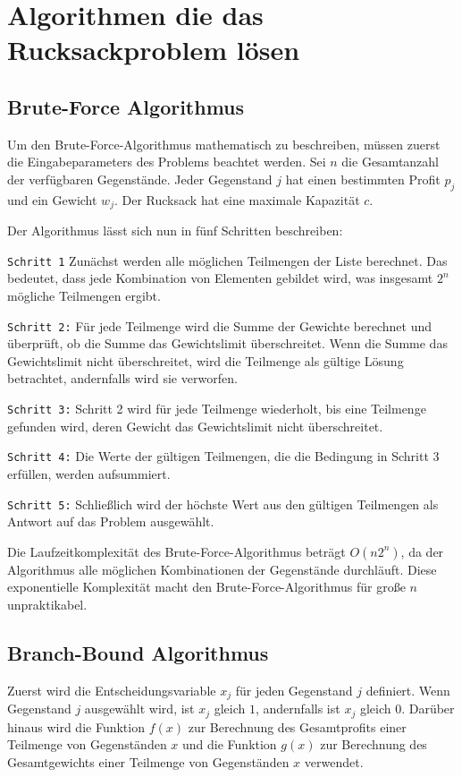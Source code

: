 
\chapter{Algorithmen die das Rucksackproblem lösen}
\section{Brute-Force Algorithmus}
Um den Brute-Force-Algorithmus mathematisch zu beschreiben, 
müssen zuerst die Eingabeparameters des Problems beachtet werden. Sei 
$n$ die Gesamtanzahl der verfügbaren Gegenstände. Jeder 
Gegenstand $j$ hat einen bestimmten Profit $p_j$ und ein Gewicht $w_j$. 
Der Rucksack hat eine maximale Kapazität $c$.

Der Algorithmus lässt sich nun in fünf Schritten beschreiben:

\texttt{Schritt 1}
Zunächst werden alle möglichen Teilmengen der Liste berechnet. 
Das bedeutet, dass jede Kombination von Elementen gebildet 
wird, was insgesamt $2^n$ mögliche Teilmengen ergibt.

\texttt{Schritt 2:}
Für jede Teilmenge wird die Summe der Gewichte berechnet und 
überprüft, ob die Summe das Gewichtslimit  
überschreitet. Wenn die Summe das Gewichtslimit nicht 
überschreitet, wird die Teilmenge als gültige Lösung 
betrachtet, andernfalls wird sie verworfen.

\texttt{Schritt 3:}
Schritt 2 wird für jede Teilmenge wiederholt, bis eine 
Teilmenge gefunden wird, deren Gewicht das Gewichtslimit 
nicht überschreitet.

\texttt{Schritt 4:}
Die Werte der gültigen Teilmengen, die die Bedingung in 
Schritt 3 erfüllen, werden aufsummiert.

\texttt{Schritt 5:}
Schließlich wird der höchste Wert aus den gültigen 
Teilmengen als Antwort auf das Problem ausgewählt.\ \cite[vgl.]{balogun2022explanatory}

Die Laufzeitkomplexität des Brute-Force-Algorithmus beträgt 
$O(n2^n)$, da der Algorithmus alle möglichen Kombinationen der 
Gegenstände durchläuft. Diese exponentielle Komplexität 
macht den Brute-Force-Algorithmus für große $n$ unpraktikabel.\ \cite[vlg.]{hristakeva2005different}

\section{Branch-Bound Algorithmus}
Zuerst wird die Entscheidungsvariable $x_j$ für jeden 
Gegenstand $j$ definiert. Wenn Gegenstand $j$ ausgewählt wird, ist $x_j$ 
gleich $1$, andernfalls ist $x_j$ gleich $0$. Darüber hinaus 
wird die Funktion $f(x)$ zur Berechnung des 
Gesamtprofits einer Teilmenge von Gegenständen $x$ und die 
Funktion $g(x)$ zur Berechnung des Gesamtgewichts einer 
Teilmenge von Gegenständen $x$ verwendet.

